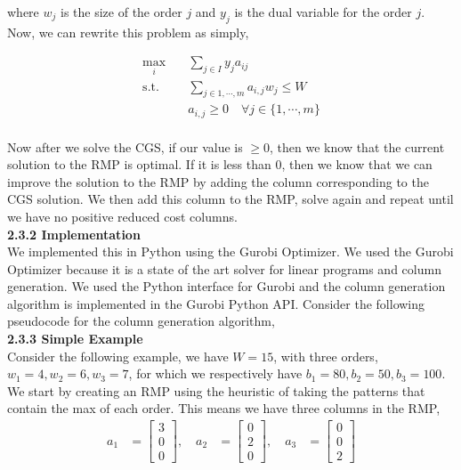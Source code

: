 \documentclass[11pt]{article}
\begin{document}
\noindent where $w_j$ is the size of the order $j$ and $y_j$ is the dual variable for the order $j$. Now, we can rewrite this problem as simply,

$$
\begin{aligned}
    \max_i \quad & \sum_{j \in I} y_j a_{ij} \\
    \text{s.t.} \quad  & \sum_{j \in {1,\cdots,m}} a_{i,j} w_j \leq W \\
    & a_{i,j} \geq 0 \quad \forall j \in \{1, \cdots, m\}
\end{aligned}
$$
\\

\noindent Now after we solve the CGS, if our value is $\geq 0$, then we know that the current solution to the RMP is optimal. If it is less than 0, then we know that we can improve the solution to the RMP by adding the column corresponding to the CGS solution. We then add this column to the RMP, solve again and repeat until we have no positive reduced cost columns.
\\

\noindent \textbf{2.3.2 Implementation}
\\

\noindent We implemented this in Python using the Gurobi Optimizer. We used the Gurobi Optimizer because it is a state of the art solver for linear programs and column generation. We used the Python interface for Gurobi and the column generation algorithm is implemented in the Gurobi Python API. Consider the following pseudocode for the column generation algorithm,
\\

\noindent \textbf{2.3.3 Simple Example}
\\

\noindent Consider the following example, we have $W = 15$, with three orders, $w_1 = 4, w_2 = 6, w_3 = 7$, for which we respectively have $b_1 = 80, b_2 = 50, b_3 = 100$.
\\

\noindent We start by creating an RMP using the heuristic of taking the patterns that contain the max of each order. This means we have three columns in the RMP,
$$
\begin{aligned}
a_1 &= \begin{bmatrix} 3 \\ 0 \\ 0 \end{bmatrix}, \quad
a_2 &= \begin{bmatrix} 0 \\ 2 \\ 0 \end{bmatrix}, \quad
a_3 &= \begin{bmatrix} 0 \\ 0 \\ 2 \end{bmatrix}
\end{aligned}
$$
\end{document}
